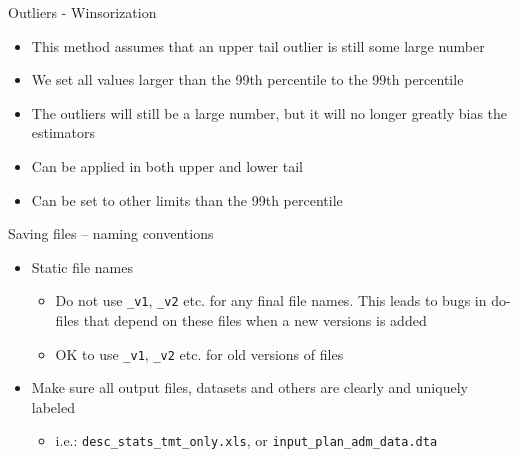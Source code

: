 \documentclass[aspectratio=169]{beamer}
\begin{document}
\begin{frame}{Outliers - Winsorization}
	\begin{itemize}
		\item This method assumes that an upper tail outlier is still some large number
		\item We set all values larger than the 99th percentile to the 99th percentile
		\item The outliers will still be a large number, but it will no longer greatly bias the estimators
		\item Can be applied in both upper and lower tail
		\item Can be set to other limits than the 99th percentile
	\end{itemize}
\end{frame}

\begin{frame}{Saving files – naming conventions}
	\begin{itemize}
		\item Static file names
		\begin{itemize}
			\item 	Do not use \texttt{\_v1}, \texttt{\_v2} etc. for any final file names. This leads to bugs in do-files that depend on these files when a new versions is added
			\item OK to use \texttt{\_v1}, \texttt{\_v2} etc. for old versions of files
		\end{itemize}
		\item Make sure all output files, datasets and others are clearly and uniquely labeled
		\begin{itemize}
			\item  i.e.: \texttt{desc\_stats\_tmt\_only.xls}, or \texttt{input\_plan\_adm\_data.dta}
		\end{itemize}
	\end{itemize}
\end{frame}
\end{document}

